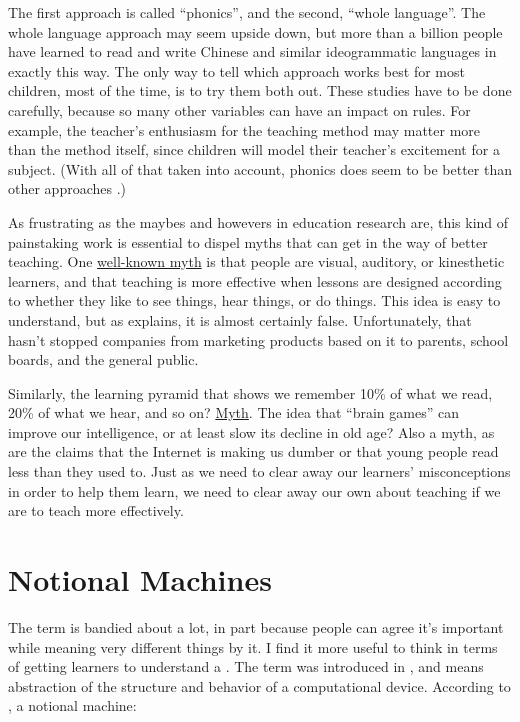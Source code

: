 The first approach is called ``phonics'', and the second, ``whole
language''. The whole language approach may seem upside down, but more
than a billion people have learned to read and write Chinese and
similar ideogrammatic languages in exactly this way. The only way to
tell which approach works best for most children, most of the time, is
to try them both out. These studies have to be done carefully, because
so many other variables can have an impact on rules. For example, the
teacher's enthusiasm for the teaching method may matter more than the
method itself, since children will model their teacher's excitement
for a subject.  (With all of that taken into account, phonics does seem
to be better than other approaches \cite{Foor1998}.)

As frustrating as the maybes and howevers in education research are,
this kind of painstaking work is essential to dispel myths that can
get in the way of better teaching.  One
\href{https://en.wikipedia.org/wiki/Learning_styles\#Learning_modalities}{well-known
  myth} is that people are visual, auditory, or kinesthetic learners,
and that teaching is more effective when lessons are designed
according to whether they like to see things, hear things, or do
things.  This idea is easy to understand, but as \cite{DeBr2015}
explains, it is almost certainly false.  Unfortunately, that hasn't
stopped companies from marketing products based on it to parents,
school boards, and the general public.

Similarly, the learning pyramid that shows we remember 10\% of what we
read, 20\% of what we hear, and so on?
\href{https://www.worklearning.com/2015/01/05/mythical-retention-data-the-corrupted-cone/}{Myth}. The
idea that ``brain games'' can improve our intelligence, or at least
slow its decline in old age? Also a myth, as are the claims that the
Internet is making us dumber or that young people read less than they
used to.  Just as we need to clear away our learners' misconceptions
in order to help them learn, we need to clear away our own about
teaching if we are to teach more effectively.

\section*{Notional Machines}

The term 
is bandied about a lot, in part because people can agree it's
important while meaning very different things by it.  I find it more
useful to think in terms of getting learners to understand a
.  The term was
introduced in \cite{DuBo1986}, and means abstraction of the structure
and behavior of a computational device.  According to \cite{Sorv2013},
a notional machine:

